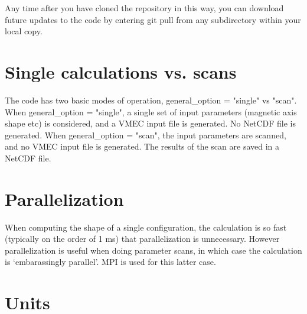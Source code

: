 Any time after you have cloned the repository in this way, you can download future updates to the code by entering {\ttfamily git pull} from any subdirectory within your local copy.



\section{Single calculations vs. scans}

The code has two basic modes of operation, {\ttfamily general\_option = "single"} vs {\ttfamily "scan"}. 
When {\ttfamily general\_option = "single"}, a single set of input parameters (magnetic axis shape etc) is
considered, and a VMEC input file is generated. No NetCDF file is generated. When {\ttfamily general\_option = "scan"},
the input parameters are scanned, and no VMEC input file is generated. The results of the scan
are saved in a NetCDF file.

\section{Parallelization}

When computing the shape of a single configuration, the calculation is so fast (typically on the order of 1 ms)
that parallelization is unnecessary. However parallelization is useful when doing parameter scans,
in which case the calculation is `embarassingly parallel'. MPI is used for this latter case.


%
%

\section{Units}

